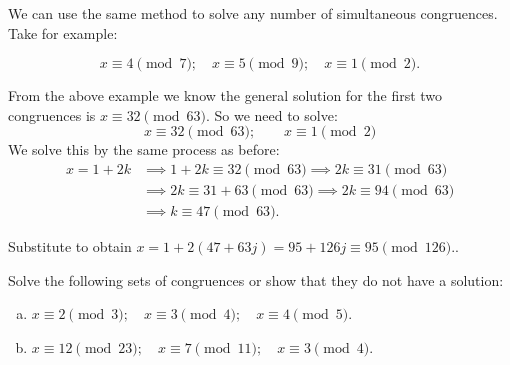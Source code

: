 We can use the same method to solve any number of simultaneous congruences. Take for example:

\[x \equiv 4 \pmod 7; \quad x \equiv 5 \pmod 9; \quad x \equiv 1 \pmod 2.\]

From the above example we know the general solution for the first two congruences  is $x \equiv 32 \pmod {63}$.  So we need to solve:
\[x \equiv 32 \pmod {63}; \qquad x \equiv 1 \pmod 2\]
We solve this by the same process as before: 
\begin{align*}
x = 1 + 2k &\implies 1 + 2k \equiv 32 \pmod {63} \implies 2k \equiv 31 \pmod {63}\\
&\implies 2k \equiv 31+63 \pmod {63} \implies 2k \equiv 94 \pmod {63} \\
&\implies k \equiv 47 \pmod {63}.
\end{align*}

Substitute to obtain $x = 1 + 2(47+ 63j) = 95 + 126j \equiv 95 \pmod{126}.$.  


\begin{exercise}{}
Solve the following sets of congruences or show that they do not have a solution:
\begin {enumerate}[(a)]
\item
$x \equiv 2 \pmod{3}; \quad x \equiv 3 \pmod{4}; \quad x \equiv 4 \pmod{5}.$
\item
$x \equiv 12 \pmod{23}; \quad x \equiv 7 \pmod{11}; \quad x \equiv 3 \pmod{4}.$
\end {enumerate}
\end {exercise}






